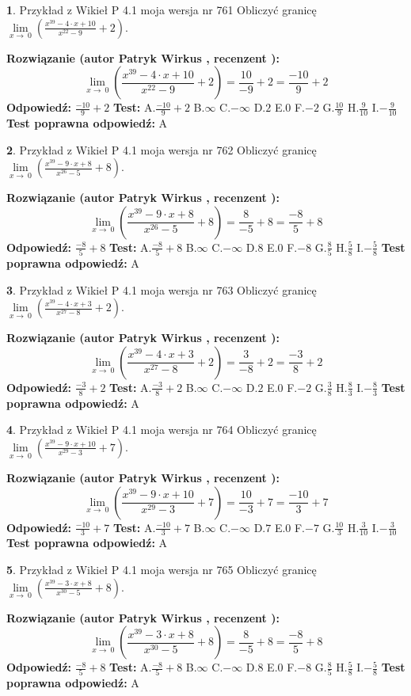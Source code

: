 \documentclass[12pt, a4paper]{article}
\theoremstyle{definition} %
\newtheorem{zad}{}
\newcommand{\zadStart}[1]{\begin{zad}#1\newline}
\newcommand{\zadStop}{\end{zad}}
\newcommand{\rozwStart}[2]{\noindent \textbf{Rozwiązanie (autor #1 , recenzent #2): }\newline}
\newcommand{\rozwStop}{\newline}
\newcommand{\odpStart}{\noindent \textbf{Odpowiedź:}\newline}
\newcommand{\odpStop}{\newline}
\newcommand{\testStart}{\noindent \textbf{Test:}\newline}
\newcommand{\testStop}{\newline}
\newcommand{\kluczStart}{\noindent \textbf{Test poprawna odpowiedź:}\newline}
\newcommand{\kluczStop}{\newline}
\begin{document}
\zadStart{Przykład z Wikieł P 4.1 moja wersja nr 761}
Obliczyć granicę $\lim\limits_{x\to\ 0}(\frac{x^{39}-4 \cdot x +10}{x^{22}-9}+2)$.
\zadStop
\rozwStart{Patryk Wirkus}{}
$$\lim\limits_{x\to\ 0}(\frac{x^{39}-4 \cdot x +10}{x^{22}-9}+2)=\frac{10}{-9}+2=\frac{-10}{9}+2$$
\rozwStop
\odpStart
$\frac{-10}{9}+2$
\odpStop
\testStart
A.$\frac{-10}{9}+2$
B.$\infty$
C.$-\infty$
D.$2$
E.$0$
F.$-2$
G.$\frac{10}{9}$
H.$\frac{9}{10}$
I.$-\frac{9}{10}$
\testStop
\kluczStart
A
\kluczStop



\zadStart{Przykład z Wikieł P 4.1 moja wersja nr 762}
Obliczyć granicę $\lim\limits_{x\to\ 0}(\frac{x^{39}-9 \cdot x +8}{x^{26}-5}+8)$.
\zadStop
\rozwStart{Patryk Wirkus}{}
$$\lim\limits_{x\to\ 0}(\frac{x^{39}-9 \cdot x +8}{x^{26}-5}+8)=\frac{8}{-5}+8=\frac{-8}{5}+8$$
\rozwStop
\odpStart
$\frac{-8}{5}+8$
\odpStop
\testStart
A.$\frac{-8}{5}+8$
B.$\infty$
C.$-\infty$
D.$8$
E.$0$
F.$-8$
G.$\frac{8}{5}$
H.$\frac{5}{8}$
I.$-\frac{5}{8}$
\testStop
\kluczStart
A
\kluczStop



\zadStart{Przykład z Wikieł P 4.1 moja wersja nr 763}
Obliczyć granicę $\lim\limits_{x\to\ 0}(\frac{x^{39}-4 \cdot x +3}{x^{27}-8}+2)$.
\zadStop
\rozwStart{Patryk Wirkus}{}
$$\lim\limits_{x\to\ 0}(\frac{x^{39}-4 \cdot x +3}{x^{27}-8}+2)=\frac{3}{-8}+2=\frac{-3}{8}+2$$
\rozwStop
\odpStart
$\frac{-3}{8}+2$
\odpStop
\testStart
A.$\frac{-3}{8}+2$
B.$\infty$
C.$-\infty$
D.$2$
E.$0$
F.$-2$
G.$\frac{3}{8}$
H.$\frac{8}{3}$
I.$-\frac{8}{3}$
\testStop
\kluczStart
A
\kluczStop



\zadStart{Przykład z Wikieł P 4.1 moja wersja nr 764}
Obliczyć granicę $\lim\limits_{x\to\ 0}(\frac{x^{39}-9 \cdot x +10}{x^{29}-3}+7)$.
\zadStop
\rozwStart{Patryk Wirkus}{}
$$\lim\limits_{x\to\ 0}(\frac{x^{39}-9 \cdot x +10}{x^{29}-3}+7)=\frac{10}{-3}+7=\frac{-10}{3}+7$$
\rozwStop
\odpStart
$\frac{-10}{3}+7$
\odpStop
\testStart
A.$\frac{-10}{3}+7$
B.$\infty$
C.$-\infty$
D.$7$
E.$0$
F.$-7$
G.$\frac{10}{3}$
H.$\frac{3}{10}$
I.$-\frac{3}{10}$
\testStop
\kluczStart
A
\kluczStop



\zadStart{Przykład z Wikieł P 4.1 moja wersja nr 765}
Obliczyć granicę $\lim\limits_{x\to\ 0}(\frac{x^{39}-3 \cdot x +8}{x^{30}-5}+8)$.
\zadStop
\rozwStart{Patryk Wirkus}{}
$$\lim\limits_{x\to\ 0}(\frac{x^{39}-3 \cdot x +8}{x^{30}-5}+8)=\frac{8}{-5}+8=\frac{-8}{5}+8$$
\rozwStop
\odpStart
$\frac{-8}{5}+8$
\odpStop
\testStart
A.$\frac{-8}{5}+8$
B.$\infty$
C.$-\infty$
D.$8$
E.$0$
F.$-8$
G.$\frac{8}{5}$
H.$\frac{5}{8}$
I.$-\frac{5}{8}$
\testStop
\kluczStart
A
\kluczStop
\end{document}
